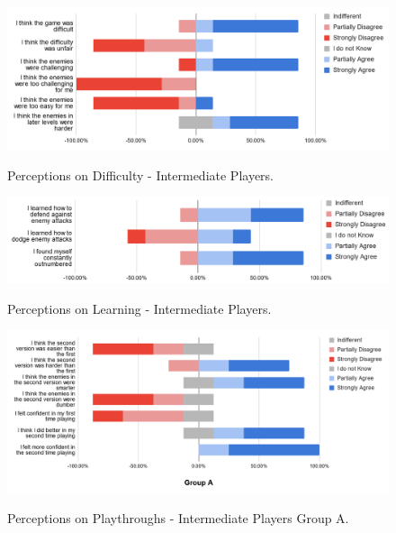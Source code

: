 \begin{figure}[!ht]
    \begin{center}
    \caption{Perceptions on Difficulty - Intermediate Players.}
        \includegraphics[width=36em]{figures/fig-perception-difficulty-intermediate-players.png}
        \label{fig:perception-difficulty-intermediate-players}
    \end{center}
\end{figure}

\begin{figure}[!ht]
    \begin{center}
    \caption{Perceptions on Learning - Intermediate Players.}
        \includegraphics[width=36em]{figures/fig-perception-learning-intermediate-players.png}
        \label{fig:perception-learning-intermediate-players}
    \end{center}
\end{figure}

\begin{figure}[!ht]
    \begin{center}
    \caption{Perceptions on Playthroughs - Intermediate Players Group A.}
        \includegraphics[width=36em]{figures/fig-perception-versions-intermediate-players-group-a.png}
        \label{fig:perception-playthrough-intermediate-players-group-a}
    \end{center}
\end{figure}

